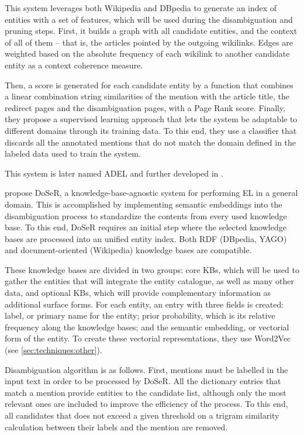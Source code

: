 This system leverages both Wikipedia and DBpedia to generate an index of entities with a set of features, which will be used during the disambiguation and pruning steps. First, it builds a graph with all candidate entities, and the context of all of them -- that is, the articles pointed by the outgoing wikilinks. Edges are weighted based on the absolute frequency of each wikilink to another candidate entity as a context coherence measure.

Then, a score is generated for each candidate entity by a function that combines a linear combination string similarities of the mention with the article title, the redirect pages and the disambiguation pages, with a Page Rank score. Finally, they propose a supervised learning approach that lets the system be adaptable to different domains through its training data. To this end, they use a classifier that discards all the annotated mentions that do not match the domain defined in the labeled data used to train the system.

This system is later named ADEL and further developed in \cite{plu2016}.

\medskip

\cite{zwicklbauer2016doser,zwicklbauer2016robust} propose DoSeR, a knowledge-base-agnostic system for performing EL in a general domain. This is accomplished by implementing semantic embeddings into the disambiguation process to standardize the contents from every used knowledge base. To this end, DoSeR requires an initial step where the selected knowledge bases are processed into an unified entity index. Both RDF (DBpedia, YAGO) and document-oriented (Wikipedia) knowledge bases are compatible.

These knowledge bases are divided in two groups: core KBs, which will be used to gather the entities that will integrate the entity catalogue, as well as many other data, and optional KBs, which will provide complementary information as additional surface forms. For each entity, an entry with three fields is created: label, or primary name for the entity; prior probability, which is its relative frequency along the knowledge bases; and the semantic embedding, or vectorial form of the entity. To create these vectorial representations, they use Word2Vec (see \autoref{sec:techniques:other}).

Disambiguation algorithm is as follows. First, mentions must be labelled in the input text in order to be processed by DoSeR. All the dictionary entries that match a mention provide entities to the candidate list, although only the most relevant ones are included to improve the efficiency of the process. To this end, all candidates that does not exceed a given threshold on a trigram similarity calculation between their labels and the mention are removed.

